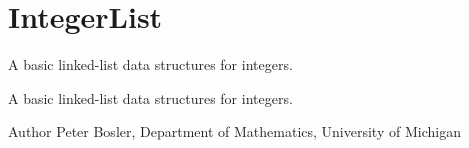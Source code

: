 \hypertarget{group___integer_list}{\section{Integer\+List}
\label{group___integer_list}
}


A basic linked-\/list data structures for integers.  


A basic linked-\/list data structures for integers. 

\begin{DoxyAuthor}{Author}
Peter Bosler, Department of Mathematics, University of Michigan 
\end{DoxyAuthor}
